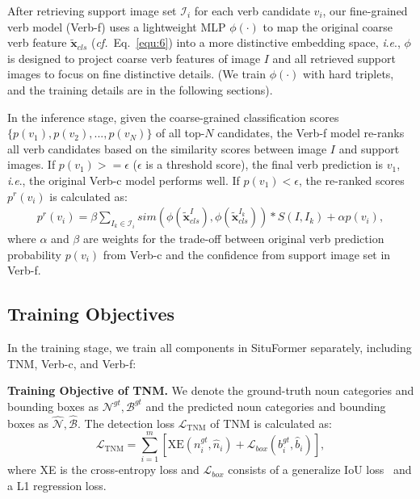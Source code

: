 \documentclass[letterpaper]{article} %
\newcommand{\ie}{\textit{i}.\textit{e}.}
\newcommand{\cf}{\textit{cf.}}
\begin{document}
After retrieving support image set $\mathcal{I}_i$ for each verb candidate $v_i$, our fine-grained verb model (Verb-f) uses a lightweight MLP $\phi(\cdot)$ to map the original coarse verb feature $\tilde{\bm{x}}_{cls}$ (\cf~Eq.~\eqref{equ:6}) into a more distinctive embedding space, \ie, $\phi$ is designed to project coarse verb features of image $I$ and all retrieved support images to focus on fine distinctive details. (We train $\phi(\cdot)$ with hard triplets, and the training details are in the following sections).


In the inference stage, given the coarse-grained classification scores $\{p(v_1),p(v_2),...,p(v_N)\}$ of all top-$N$ candidates, the Verb-f model re-ranks all verb candidates based on the similarity scores between image $I$ and support images. If $p(v_1) >= \epsilon$ ($\epsilon$ is a threshold score), the final verb prediction is $v_1$, \ie, the original Verb-c model performs well. If $p(v_1) < \epsilon$, the re-ranked scores $p^r(v_i)$ is calculated as:
\begin{equation}
\begin{aligned}
p^r(v_i) = \beta \sum_{I_k \in \mathcal{I}_i} sim(\phi(\tilde{\bm{x}}_{cls}^I), \phi(\tilde{\bm{x}}_{cls}^{I_k})) * S(I, I_k) + \alpha p(v_i),
\end{aligned}
\end{equation}
where $\alpha$ and $\beta$ are weights for the trade-off between original verb prediction probability $p(v_i)$ from Verb-c and the confidence from support image set in Verb-f.



















\subsection{Training Objectives}
\label{sec:training}

In the training stage, we train all components in SituFormer separately, including TNM, Verb-c, and Verb-f:

\noindent\textbf{Training Objective of TNM.}
We denote the ground-truth noun categories and bounding boxes as $\mathcal{N}^{gt}, \mathcal{B}^{gt}$ and the predicted noun categories and bounding boxes as $\hat{\mathcal{N}},\hat{\mathcal{B}}$. The detection loss $\mathcal{L}_{\text{TNM}}$ of TNM is calculated as:
\begin{equation}
   \mathcal{L}_{\text{TNM}} = \sum_{i=1}^{m} \left[\text{XE}(n^{gt}_i, \hat{n}_i) + \mathcal{L}_{box}(b^{gt}_i, \hat{b}_i)\right],
\end{equation}
where XE is the cross-entropy loss and $\mathcal{L}_{box}$ consists of a generalize IoU loss~\cite{rezatofighi2019generalized} and a L1 regression loss.
\end{document}
